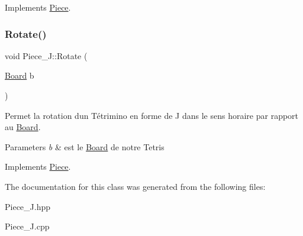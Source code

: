 Implements \hyperlink{classPiece_a56cdf7f4234fe848a3e203b693b7a862}{Piece}.

\mbox{\label{classPiece__J_a05b85a353b6d5cefb0055206d4a39014}} 
\subsubsection{\texorpdfstring{Rotate()}{Rotate()}}
{\footnotesize\ttfamily void Piece\+\_\+\+J\+::\+Rotate (\begin{DoxyParamCaption}\item[{\hyperlink{classBoard}{Board}}]{b }\end{DoxyParamCaption})\hspace{0.3cm}{\ttfamily [virtual]}}



Permet la rotation d\textquotesingle{}un Tétrimino en forme de J dans le sens horaire par rapport au \hyperlink{classBoard}{Board}. 


\begin{DoxyParams}{Parameters}
{\em b} & est le \hyperlink{classBoard}{Board} de notre Tetris \\
\hline
\end{DoxyParams}


Implements \hyperlink{classPiece_a078f3cc6281cb8f60af3ae2266c651ba}{Piece}.



The documentation for this class was generated from the following files\+:\begin{DoxyCompactItemize}
\item 
Piece\+\_\+\+J.\+hpp\item 
Piece\+\_\+\+J.\+cpp\end{DoxyCompactItemize}
